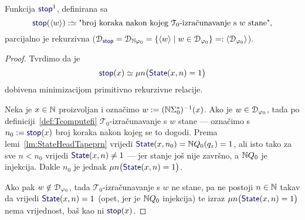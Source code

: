 \begin{lema}[{name=[parcijalna rekurzivnost brojenja koraka do zaustavljanja]}]\label{lm:stopprek}
Funkcija $\f{stop}^1$\!, definirana sa
\begin{equation}
    \f{stop}(\kr w):\simeq\text{"broj koraka nakon kojeg $\mathcal T_0$-izračunavanje s $w$ stane",}
\end{equation}
    parcijalno je rekurzivna ($\dom{\f{stop}}=\dom{\N\varphi_0}=\{\kr w\mid w\in\dom{\varphi_0}\}=:\kr{\dom{\varphi_0}}$).
\end{lema}
\begin{proof}
Tvrdimo da je
\begin{equation}\label{eq:stopdef}
    \f{stop}(x)\simeq\mu n\bigl(\f{State}(x,n)=1\bigr)
\end{equation}
dobivena minimizacijom primitivno rekurzivne relacije.

Neka je $x\in{\mathbb N}$ proizvoljan i označimo $w:=({\mathbb N}\Sigma_0^*)^{-1}(x)$. Ako je $w\in\mathcal D_{\varphi_0}$, tada po definiciji~\ref{def:Tcomputefi} $\mathcal T_0$-izračunavanje s $w$ stane --- označimo s $n_0:=\f{stop}(x)$ broj koraka nakon kojeg se to dogodi. Prema lemi~\ref{lm:StateHeadTapeprn} vrijedi $\f{State}(x,n_0)=\N Q_0(q_z)=1$, ali isto tako za sve $n<n_0$ vrijedi $\f{State}(x,n)\ne 1$ --- jer stanje još nije završno, a ${\mathbb N} Q_0$ je injekcija. Dakle $n_0$ je jednak $\mu n\bigl(\f{State}(x,n)=1\bigr)$.

Ako pak $w\notin\mathcal D_{\varphi_0}$, tada $\mathcal T_0$-izračunavanje s $w$ ne stane, pa ne postoji $n\in{\mathbb N}$ takav da vrijedi $\f{State}(x,n)=1$ (opet, jer je ${\mathbb N} Q_0$ injekcija) te izraz $\mu n\bigl(\f{State}(x,n)=1\bigr)$ nema vrijednost, baš kao ni $\f{stop}(x)$.
\end{proof}


